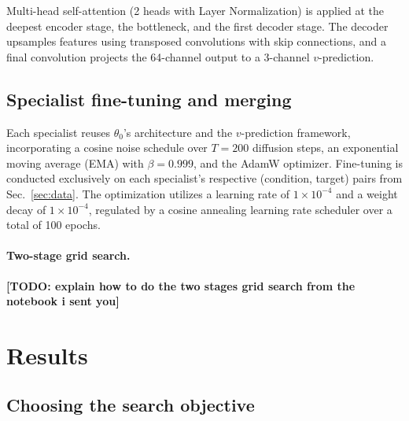 \documentclass{article}
\newcommand{\todo}[1]{\textbf{\color{red}[TODO: #1]}}
\begin{document}
Multi-head self-attention (2 heads with Layer Normalization) is applied at the deepest encoder stage, the bottleneck, and the first decoder stage. The decoder upsamples features using transposed convolutions with skip connections, and a final convolution projects the 64-channel output to a 3-channel $v$-prediction.


\subsection{Specialist fine-tuning and merging}
\label{sec:specialists}

Each specialist reuses $\theta_0$'s architecture and the $v$-prediction framework, incorporating a cosine noise schedule over $T = 200$ diffusion steps, an exponential moving average (EMA) with $\beta=0.999$, and the AdamW optimizer. Fine-tuning is conducted exclusively on each specialist's respective (condition, target) pairs from Sec.~\ref{sec:data}. The optimization utilizes a learning rate of $1 \times 10^{-4}$ and a weight decay of $1 \times 10^{-4}$, regulated by a cosine annealing learning rate scheduler over a total of 100 epochs.

\paragraph*{Two-stage grid search.} \todo{explain how to do the two stages grid search from the notebook i sent you}

\section{Results}
\label{sec:results}

\subsection{Choosing the search objective}
\end{document}
